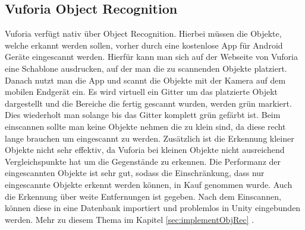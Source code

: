 \subsection{Vuforia Object Recognition}
\label{sec:vufObjRec}
Vuforia verfügt nativ über Object Recognition.\cite{Vuforia} Hierbei müssen die Objekte, welche erkannt werden sollen, vorher durch eine kostenlose App für Android Geräte eingescannt werden. Hierfür kann man sich auf der Webseite von Vuforia eine Schablone ausdrucken, auf der man die zu scannenden Objekte platziert. Danach nutzt man die App und scannt die Objekte mit der Kamera auf dem mobilen Endgerät ein. Es wird virtuell ein Gitter um das platzierte Objekt dargestellt und die Bereiche die fertig gescannt wurden, werden grün markiert. Dies wiederholt man solange bis das Gitter komplett grün gefärbt ist.  Beim einscannen sollte man keine Objekte nehmen die zu klein sind, da diese recht lange brauchen um eingescannt zu werden. Zusätzlich ist die Erkennung kleiner Objekte nicht sehr effektiv, da Vuforia bei kleinen Objekte nicht ausreichend Vergleichspunkte hat um die Gegenstände zu erkennen. Die Performanz der eingescannten Objekte ist sehr gut, sodass die Einschränkung, dass nur eingescannte Objekte erkennt werden können, in Kauf genommen wurde. Auch die Erkennung über weite Entfernungen ist gegeben. Nach dem Einscannen, können diese in eine Datenbank importiert und problemlos in Unity eingebunden werden. Mehr zu diesem Thema im Kapitel \ref{sec:implementObjRec}  .
